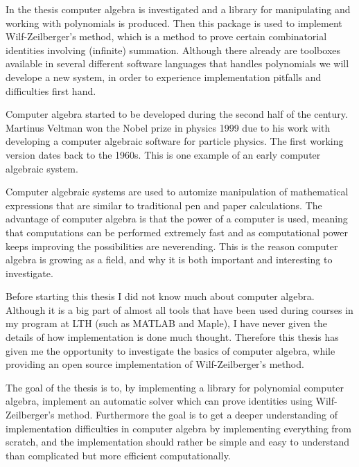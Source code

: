 In the thesis computer algebra is investigated and a library for manipulating and working with polynomials is produced. Then this package is used to implement Wilf-Zeilberger's method, which is a method to prove certain combinatorial identities involving (infinite) summation. Although there already are toolboxes available in several different software languages that handles polynomials we will develope a new system, in order to experience implementation pitfalls and difficulties first hand.

Computer algebra started to be developed during the second half of the  century. Martinus Veltman won the Nobel prize in physics 1999 due to his work with developing a computer algebraic software for particle physics. The first working version dates back to the 1960s. This is one example of an early computer algebraic system.

Computer algebraic systems are used to automize manipulation of mathematical expressions that are similar to traditional pen and paper calculations. The advantage of computer algebra is that the power of a computer is used, meaning that computations can be performed extremely fast and as computational power keeps improving the possibilities are neverending. This is the reason computer algebra is growing as a field, and why it is both important and interesting to investigate.

Before starting this thesis I did not know much about computer algebra. Although it is a big part of almost all tools that have been used during courses in my program at LTH (such as MATLAB and Maple), I have never given the details of how implementation is done much thought. Therefore this thesis has given me the opportunity to investigate the basics of computer algebra, while providing an open source implementation of Wilf-Zeilberger's method.

The goal of the thesis is to, by implementing a library for polynomial computer algebra, implement an automatic solver which can prove identities using Wilf-Zeilberger's method. Furthermore the goal is to get a deeper understanding of implementation difficulties in computer algebra by implementing everything from scratch, and the implementation should rather be simple and easy to understand than complicated but more efficient computationally.
